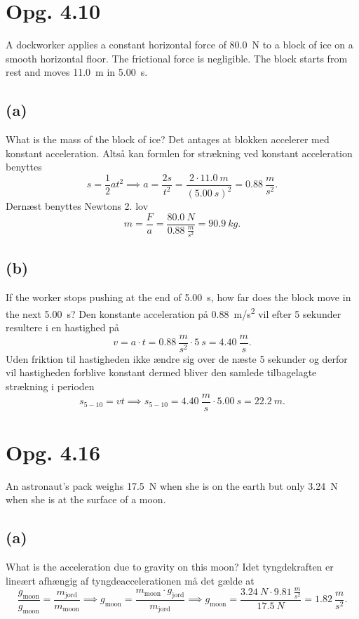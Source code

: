 \documentclass[12pt]{article}
\begin{document}
\section*{Opg. 4.10}
A dockworker applies a constant horizontal force of \qty{80,0}{N} to a block of ice on a smooth horizontal floor. The frictional force is negligible. The block starts from rest and moves \qty{11,0}{m} in \qty{5,00}{s}.


\subsection*{(a)}
What is the mass of the block of ice?
\bigbreak
Det antages at blokken accelerer med konstant acceleration. Altså kan formlen for strækning ved konstant acceleration benyttes
\[
s = \frac{1}{2}at^2 \implies a = \frac{2s}{t^2} = \frac{2\cdot \qty{11,0}{m}}{(\qty{5,00}{s})^2} = \qty{0,88}{\frac{m}{s^2}}
.\] 
Dernæst benyttes Newtons 2. lov
\[
m = \frac{F}{a} = \frac{\qty{80,0}{N}}{\qty{0,88}{\frac{m}{s^2}}} = \qty{90,9}{kg}
.\] 

\subsection*{(b)}
If the worker stops pushing at the end of \qty{5,00}{s}, how far does the block move in the next \qty{5,00}{s}?
\bigbreak
Den konstante acceleration på \qty{0,88}{m/s^2} vil efter 5 sekunder resultere i en hastighed på
\[
v = a\cdot t = \qty{0,88}{\frac{m}{s^2}}\cdot \qty{5}{s} = \qty{4,40}{\frac{m}{s}}
.\] 
Uden friktion til hastigheden ikke ændre sig over de næste 5 sekunder og derfor vil hastigheden forblive konstant dermed bliver den samlede tilbagelagte strækning i perioden
\[
s_{5-10} = vt \implies s_{5-10} = \qty{4,40}{\frac{m}{s}}\cdot \qty{5,00}{s} = \qty{22,2}{m}
.\] 

\section*{Opg. 4.16}
An astronaut’s pack weighs \qty{17,5}{N} when she is on the earth but only \qty{3,24}{N} when she is at the surface of a moon.


\subsection*{(a)}
What is the acceleration due to gravity on this moon?
\bigbreak
Idet tyngdekraften er lineært afhængig af tyngdeaccelerationen må det gælde at
\[
\frac{g_{\mathrm{moon}}}{g_{\mathrm{moon} }} = \frac{m_{\mathrm{jord} }}{m_{\mathrm{moon}}} \implies g_{\mathrm{moon}} = \frac{m_{\mathrm{moon}}\cdot g_{\mathrm{jord}}}{m_{\mathrm{jord}}} \implies g_{\mathrm{moon}} = \frac{\qty{3,24}{N}\cdot \qty{9,81}{\frac{m}{s^2}}}{\qty{17,5}{N}} = \qty{1,82}{\frac{m}{s^2}}
.\] 
\end{document}
